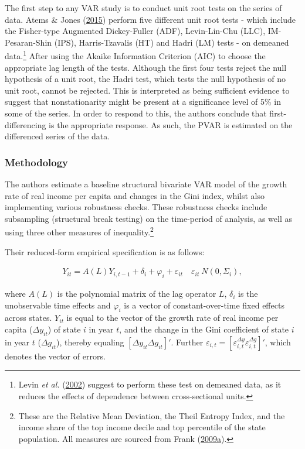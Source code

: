 \documentclass[11pt,preprint, authoryear]{elsarticle}
\numberwithin{equation}{section}
\numberwithin{figure}{section}
\numberwithin{table}{section}
\let\rmarkdownfootnote\footnote%
\def\footnote{\protect\rmarkdownfootnote}
\begin{document}
The first step to any VAR study is to conduct unit root tests on the
series of data. Atems \& Jones (\protect\hyperlink{ref-atems}{2015})
perform five different unit root tests - which include the Fisher-type
Augmented Dickey-Fuller (ADF), Levin-Lin-Chu (LLC), IM-Pesaran-Shin
(IPS), Harris-Tzavalis (HT) and Hadri (LM) tests - on demeaned
data.\footnote{Levin \emph{et al.} (\protect\hyperlink{ref-levin}{2002})
  suggest to perform these test on demeaned data, as it reduces the
  effects of dependence between cross-sectional units.} After using the
Akaike Information Criterion (AIC) to choose the appropriate lag length
of the tests. Although the first four tests reject the null hypothesis
of a unit root, the Hadri test, which tests the null hypothesis of no
unit root, cannot be rejected. This is interpreted as being sufficient
evidence to suggest that nonstationarity might be present at a
significance level of 5\% in some of the series. In order to respond to
this, the authors conclude that first-differencing is the appropriate
response. As such, the PVAR is estimated on the differenced series of
the data.

\hypertarget{methodology}{%
\subsubsection*{Methodology}\label{methodology}}

The authors estimate a baseline structural bivariate VAR model of the
growth rate of real income per capita and changes in the Gini index,
whilst also implementing various robustness checks. These robustness
checks include subsampling (structural break testing) on the time-period
of analysis, as well as using three other measures of
inequality.\footnote{These are the Relative Mean Deviation, the Theil
  Entropy Index, and the income share of the top income decile and top
  percentile of the state population. All measures are sourced from
  Frank
  (\protect\hyperlink{ref-frank}{2009}\protect\hyperlink{ref-frank}{a}).}

Their reduced-form empirical specification is as follows:

\begin{align}\tag{1}
Y_{it} = A(L)Y_{i,t-1} + \delta_i + \varphi_i + \varepsilon_{it} \hspace{12pt} \varepsilon_{it} ~ N(0, \Sigma_{i}), \label{eq1}
\end{align}

where \(A(L)\) is the polynomial matrix of the lag operator \(L\),
\(\delta_i\) is the unobservable time effects and \(\varphi_i\) is a
vector of constant-over-time fixed effects across states. \(Y_{it}\) is
equal to the vector of the growth rate of real income per capita
(\(\Delta y_{it}\)) of state \(i\) in year \(t\), and the change in the
Gini coefficient of state \(i\) in year \(t\) (\(\Delta g_{it}\)),
thereby equaling \([\Delta y_{it} \Delta g_{it} ]'\). Further
\(\varepsilon_{i,t} = [\varepsilon_{i,t}^{\Delta y} \varepsilon_{i,t}^{\Delta g}]'\),
which denotes the vector of errors.
\end{document}
